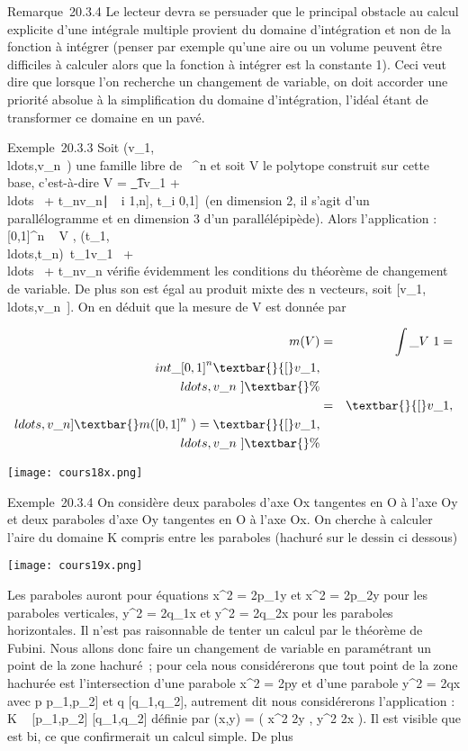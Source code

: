 \documentclass[]{article}
\begin{document}
Remarque~20.3.4 Le lecteur devra se persuader que le principal obstacle
au calcul explicite d'une intégrale multiple provient du domaine
d'intégration et non de la fonction à intégrer (penser par exemple
qu'une aire ou un volume peuvent être difficiles à calculer alors que la
fonction à intégrer est la constante 1). Ceci veut dire que lorsque l'on
recherche un changement de variable, on doit accorder une priorité
absolue à la simplification du domaine d'intégration, l'idéal étant de
transformer ce domaine en un pavé.

Exemple~20.3.3 Soit
(v\_1,\\ldots,v\_n~)
une famille libre de ~^n et soit V le polytope construit sur
cette base, c'est-à-dire V = \t\_1v\_1
+ \\ldots~ +
t\_nv\_n∣\forall~~i
\in {[}1,n{]}, t\_i \in {[}0,1{]}\ (en dimension 2,
il s'agit d'un parallélogramme et en dimension 3 d'un parallélépipède).
Alors l'application \phi : {[}0,1{]}^n \rightarrow~ V ,
(t\_1,\\ldots,t\_n)\mapsto~t\_1v\_1~
+ \\ldots~ +
t\_nv\_n vérifie évidemment les conditions du théorème
de changement de variable. De plus son \jmathacobien est égal au produit
mixte des n vecteurs, soit
{[}v\_1,\\ldots,v\_n~{]}.
On en déduit que la mesure de V est donnée par

\begin{align*} m(V )& =&
\int  \_V ~1 =\\int

\_{[}0,1{]}^n\textbar{}{[}v\_1,\\ldots,v\_n~{]}\textbar{}
\%& \\ & =&
\textbar{}{[}v\_1,\\ldots,v\_n{]}\textbar{}m({[}0,1{]}^n~)
= \textbar{}{[}v\_
1,\\ldots,v\_n~{]}\textbar{}\%&
\\ \end{align*}

\texttt{[image: cours18x.png]}

Exemple~20.3.4 On considère deux paraboles d'axe Ox tangentes en O à
l'axe Oy et deux paraboles d'axe Oy tangentes en O à l'axe Ox. On
cherche à calculer l'aire du domaine K compris entre les paraboles
(hachuré sur le dessin ci dessous)

\texttt{[image: cours19x.png]}

Les paraboles auront pour équations x^2 = 2p\_1y et
x^2 = 2p\_2y pour les paraboles verticales,
y^2 = 2q\_1x et y^2 = 2q\_2x pour
les paraboles horizontales. Il n'est pas raisonnable de tenter un calcul
par le théorème de Fubini. Nous allons donc faire un changement de
variable en paramétrant un point de la zone hachuré~; pour cela nous
considérerons que tout point de la zone hachurée est l'intersection
d'une parabole x^2 = 2py et d'une parabole y^2 =
2qx avec p \in {[}p\_1,p\_2{]} et q \in
{[}q\_1,q\_2{]}, autrement dit nous considérerons
l'application \phi : K \rightarrow~ {[}p\_1,p\_2{]} \times
{[}q\_1,q\_2{]} définie par \phi(x,y) = ( x^2
\over 2y , y^2 \over 2x
). Il est visible que \phi est bi\jmathective, ce que confirmerait un calcul
simple. De plus
\end{document}
